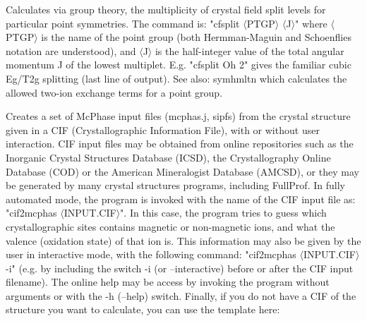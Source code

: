 \begin{description}
\begin{verbatim}
\end{verbatim}
\item [\prg cfsplit\index{cfsplit}\label{cfsplit}:] Calculates via group theory, the multiplicity of crystal field split levels 
for particular point symmetries. The command is: "{\prg cfsplit $\langle$PTGP$\rangle$ $\langle$J$\rangle$}"
where {\prg $\langle$PTGP$\rangle$} is the name of the point group (both Hermman-Maguin and 
Schoenflies notation are understood), and {\prg $\langle$J$\rangle$} is the half-integer value 
of the total angular momentum J of the lowest multiplet. E.g. "{\prg cfsplit Oh 2}" gives the 
familiar cubic Eg/T2g splitting (last line of output).
See also: {\prg symhmltn} which calculates the allowed two-ion exchange terms for a point group.
\item [\prg cif2mcphas\index{cif2mcphas}\label{cif2mcphas} {[options]} $\langle$INPUT.CIF$\rangle$:] 
Creates a set of McPhase input files (mcphas.j, sipfs) from the crystal structure given in a CIF 
(Crystallographic Information File), with or without user interaction. CIF input files may be obtained 
from online repositories such as the Inorganic Crystal Structures Database (ICSD), the Crystallography 
Online Database (COD) or the American Mineralogist Database (AMCSD), or they may be generated by many 
crystal structures programs, including FullProf. In fully automated mode, the program is invoked with 
the name of the CIF input file as: "{\prg cif2mcphas $\langle$INPUT.CIF$\rangle$}". In this case, the
program tries to guess which crystallographic sites contains magnetic or non-magnetic ions, and what the 
valence (oxidation state) of that ion is. This information may also be given by the user in interactive
mode, with the following command: "{\prg cif2mcphas $\langle$INPUT.CIF$\rangle$ -i}" (e.g. by including
the switch {\prg -i} (or {\prg --interactive}) before or after the CIF input filename). The online help
may be access by invoking the program without arguments or with the {\prg -h} ({\prg --help}) switch.
Finally, if you do not have a CIF of the structure you want to calculate, you can use the template here:


\end{description}
